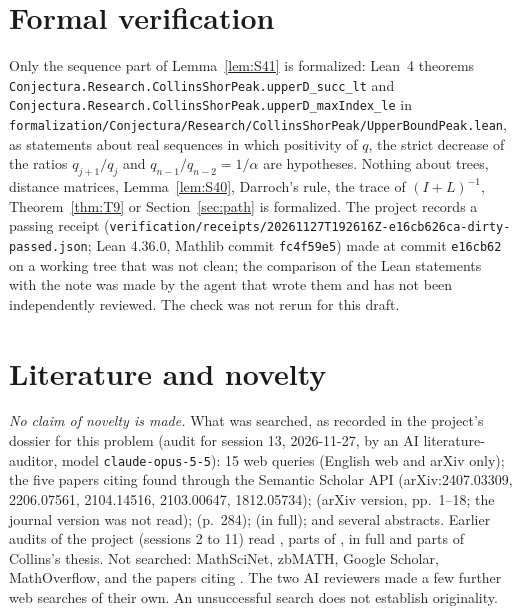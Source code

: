 \documentclass[11pt]{amsart}
\theoremstyle{definition}
\theoremstyle{remark}
\begin{document}
\section{Formal verification}\label{sec:formal}

Only the sequence part of Lemma~\ref{lem:S41} is formalized: Lean~4
theorems \nolinkurl{Conjectura.Research.CollinsShorPeak.upperD_succ_lt} and
\nolinkurl{Conjectura.Research.CollinsShorPeak.upperD_maxIndex_le} in
\nolinkurl{formalization/Conjectura/Research/CollinsShorPeak/UpperBoundPeak.lean},
as statements about real sequences in which positivity of $q$, the strict
decrease of the ratios $q_{j+1}/q_j$ and $q_{n-1}/q_{n-2}=1/\alpha$ are
hypotheses. Nothing about trees, distance matrices, Lemma~\ref{lem:S40},
Darroch's rule, the trace of $(I+L)^{-1}$, Theorem~\ref{thm:T9} or
Section~\ref{sec:path} is formalized. The project records a passing receipt
(\nolinkurl{verification/receipts/20261127T192616Z-e16cb626ca-dirty-passed.json};
Lean 4.36.0, Mathlib commit \texttt{fc4f59e5}) made at commit
\texttt{e16cb62} on a working tree that was not clean; the comparison of the
Lean statements with the note was made by the agent that wrote them and has
not been independently reviewed. The check was not rerun for this draft.

\section{Literature and novelty}\label{sec:literature}

\emph{No claim of novelty is made.} What was searched, as recorded in the
project's dossier for this problem (audit for session 13, 2026-11-27, by an
AI literature-auditor, model \nolinkurl{claude-opus-5-5}): 15 web queries
(English web and arXiv only); the five papers citing \cite{AAB} found
through the Semantic Scholar API (arXiv:2407.03309, 2206.07561, 2104.14516,
2103.00647, 1812.05734); \cite{AMW} (arXiv version, pp.~1--18; the journal
version was not read); \cite{Pit97} (p.~284); \cite{Mer90} (in full); and
several abstracts. Earlier audits of the project (sessions 2 to 11) read
\cite{AAB}, parts of \cite{GL78}, \cite{Col89} in full and parts of Collins's
thesis. Not searched: MathSciNet, zbMATH, Google Scholar, MathOverflow, and
the papers citing \cite{AMW}. The two AI reviewers made a few further web
searches of their own. An unsuccessful search does not establish
originality.
\end{document}
